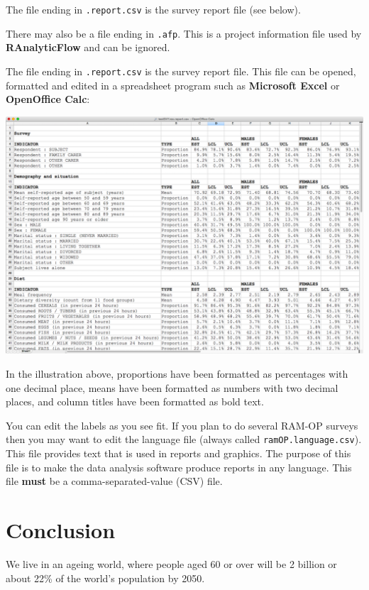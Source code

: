 \documentclass[12pt,a4paper]{book}
\theoremstyle{definition}
\theoremstyle{definition}
\theoremstyle{definition}
\theoremstyle{remark}
\begin{document}
The file ending in \texttt{.report.csv} is the survey report file (see
below).

There may also be a file ending in \texttt{.afp}. This is a project
information file used by \textbf{RAnalyticFlow} and can be ignored.

The file ending in \texttt{.report.csv} is the survey report file. This
file can be opened, formatted and edited in a spreadsheet program such
as \textbf{Microsoft Excel} or \textbf{OpenOffice Calc}:

\begin{center}\includegraphics[width=16.67in]{figures/reportFile} \end{center}

In the illustration above, proportions have been formatted as
percentages with one decimal place, means have been formatted as numbers
with two decimal places, and column titles have been formatted as bold
text.

You can edit the labels as you see fit. If you plan to do several RAM-OP
surveys then you may want to edit the language file (always called
\texttt{ramOP.language.csv}). This file provides text that is used in
reports and graphics. The purpose of this file is to make the data
analysis software produce reports in any language. This file
\textbf{must} be a comma-separated-value (CSV) file.

\hypertarget{conclusion}{%
\chapter{Conclusion}\label{conclusion}}

We live in an ageing world, where people aged 60 or over will be 2
billion or about 22\% of the world's population by 2050.
\end{document}
